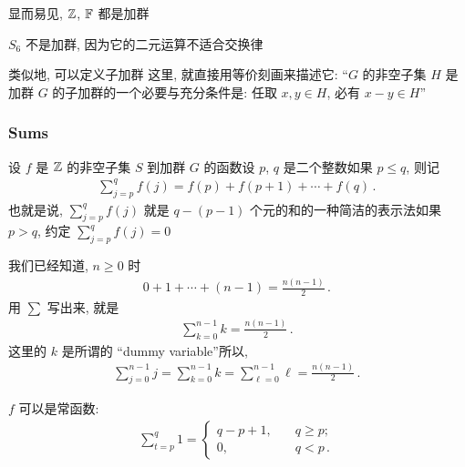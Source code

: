 \begin{example}
    显而易见, $\mathbb{Z}$, $\mathbb{F}$ 都是加群\period
\end{example}

\begin{example}
    $S_6$ 不是加群, 因为它的二元运算不适合交换律\period
\end{example}

\begin{remark}
    类似地, 可以定义子加群 \period 这里, 就直接用等价刻画来描述它: ``$G$ 的非空子集 $H$ 是加群 $G$ 的子加群的一个必要与充分条件是: 任取 $x,y \in H$, 必有 $x-y \in H$\period ''
\end{remark}

\subsubsection*{Sums}

\begin{definition}
    设 $f$ 是 $\mathbb{Z}$ 的非空子集 $S$ 到加群 $G$ 的函数\period 设 $p$, $q$ 是二个整数\period 如果 $p \leq q$, 则记
    \begin{align*}
        \sum_{j = p}^{q} f(j) = f(p) + f(p + 1) + \cdots + f(q)\period
    \end{align*}
    也就是说, $\sum_{j = p}^{q} f(j)$ 就是 $q - (p - 1)$ 个元的和的一种简洁的表示法\period 如果 $p > q$, 约定 $\sum_{j = p}^{q} f(j) = 0$\period
\end{definition}

\begin{example}
    我们已经知道, $n \geq 0$ 时
    \begin{align*}
        0 + 1 + \cdots + (n-1) = \frac{n(n-1)}{2}\period
    \end{align*}
    用 $\sum$ 写出来, 就是
    \begin{align*}
        \sum_{k=0}^{n-1} k = \frac{n(n-1)}{2}\period
    \end{align*}
    这里的 $k$ 是所谓的 ``dummy variable''\period 所以,
    \begin{align*}
        \sum_{j=0}^{n-1} j = \sum_{k=0}^{n-1} k = \sum_{\ell=0}^{n-1} \ell = \frac{n(n-1)}{2}\period
    \end{align*}
\end{example}

\begin{example}
    $f$ 可以是常函数:
    \begin{align*}
        \sum_{t=p}^{q} 1 = \begin{cases}
            q - p + 1, & \quad q \geq p;     \\
            0,         & \quad q < p \period
        \end{cases}
    \end{align*}
\end{example}

